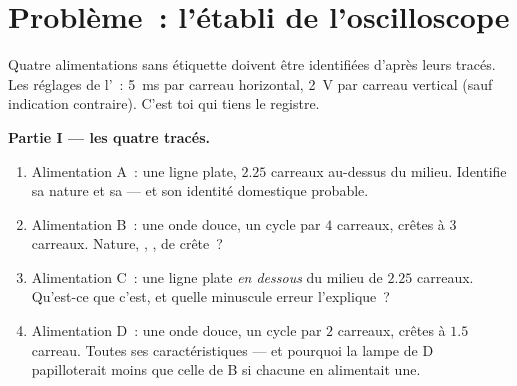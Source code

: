 \section{Problème~: l'établi de l'oscilloscope}

\begin{problem}\label{pb:g9:alternating-current:1}
Quatre alimentations sans étiquette doivent être identifiées d'après
leurs tracés. Les réglages de l'~: \qty{5}{ms} par
carreau horizontal, \qty{2}{V} par carreau vertical (sauf indication
contraire). C'est toi qui tiens le registre.

\medskip\noindent\textbf{Partie I --- les quatre tracés.}
\begin{enumerate}
  \item Alimentation A~: une ligne plate, $2.25$ carreaux au-dessus
        du milieu. Identifie sa nature et sa  --- et son
        identité domestique probable.
  \item Alimentation B~: une onde douce, un cycle par $4$
        carreaux, crêtes à $3$ carreaux. Nature, ,
        ,  de crête~?
  \item Alimentation C~: une ligne plate \emph{en dessous} du
        milieu de $2.25$ carreaux. Qu'est-ce que c'est, et quelle
        minuscule erreur l'explique~?
  \item Alimentation D~: une onde douce, un cycle par $2$
        carreaux, crêtes à $1.5$ carreau. Toutes ses
        caractéristiques --- et pourquoi la lampe de D
        papilloterait moins que celle de B si chacune en
        alimentait une.
\end{enumerate}


\end{problem}
